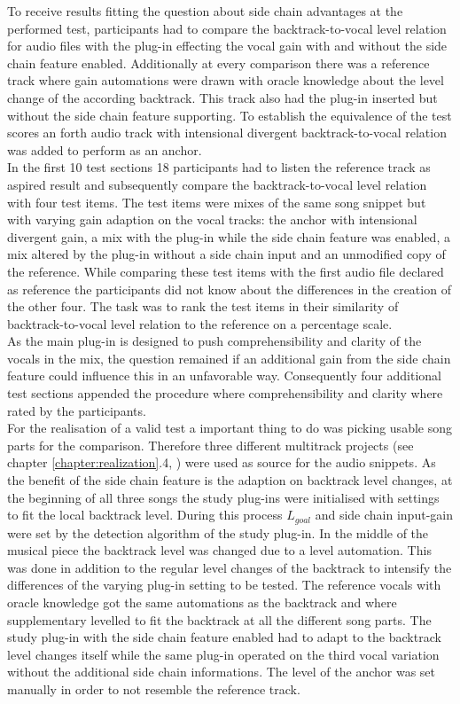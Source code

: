 To receive results fitting the question about side chain advantages at the performed test, participants had to compare the backtrack-to-vocal level relation for audio files with the plug-in effecting the vocal gain with and without the side chain feature enabled. Additionally at every comparison there was a reference track where gain automations were drawn with oracle knowledge about the level change of the according backtrack. This track also had the plug-in inserted but without the side chain feature supporting. To establish the equivalence of the test scores an forth audio track with intensional divergent backtrack-to-vocal relation was added to perform as an anchor.\\
In the first 10 test sections 18 participants had to listen the reference track as aspired result and subsequently compare the backtrack-to-vocal level relation with four test items. The test items were mixes of the same song snippet but with varying gain adaption on the vocal tracks: the anchor with intensional divergent gain, a mix with the plug-in while the side chain feature was enabled, a mix altered by the plug-in without a side chain input and an unmodified copy of the reference. While comparing these test items with the first audio file declared as reference the participants did not know about the differences in the creation of the other four. The task was to rank the test items in their similarity of backtrack-to-vocal level relation to the reference on a percentage scale.\\
As the main plug-in is designed to push comprehensibility and clarity of the vocals in the mix, the question remained if an additional gain from the side chain feature could influence this in an unfavorable way. Consequently four additional test sections appended the procedure where comprehensibility and clarity where rated by the participants.\\
For the realisation of a valid test a important thing to do was picking usable song parts for the comparison. Therefore three different multitrack projects (see chapter \ref{chapter:realization}.4, \cite{MultiT}) were used as source for the audio snippets. As the benefit of the side chain feature is the adaption on backtrack level changes, at the beginning of all three songs the study plug-ins were initialised with settings to fit the local backtrack level. During this process $L_{goal}$ and side chain input-gain were set by the detection algorithm of the study plug-in. In the middle of the musical piece the backtrack level was changed due to a level automation. This was done in addition to the regular level changes of the backtrack to intensify the differences of the varying plug-in setting to be tested. The reference vocals with oracle knowledge got the same automations as the backtrack and where supplementary levelled to fit the backtrack at all the different song parts. The study plug-in with the side chain feature enabled had to adapt to the backtrack level changes itself while the same plug-in operated on the third vocal variation without the additional side chain informations. The level of the anchor was set manually in order to not resemble the reference track.\\
